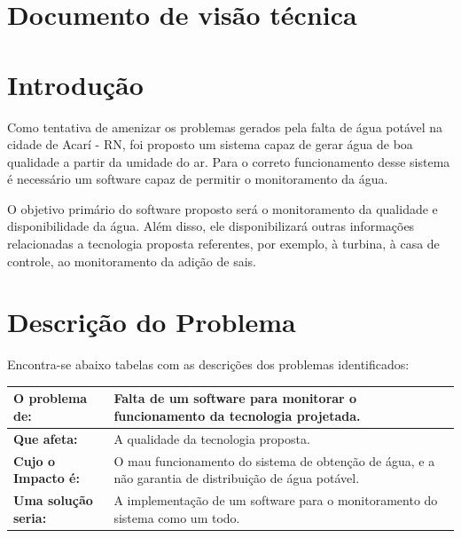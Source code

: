  
 
%
 
\section*{Documento de visão técnica}


\section*{Introdução}
Como tentativa de amenizar os problemas gerados pela falta de água potável na cidade de Acarí - RN, foi proposto um sistema capaz de gerar água de boa qualidade a partir da umidade do ar. Para o correto funcionamento desse sistema é necessário um software capaz de permitir o monitoramento da água.

O objetivo primário do software proposto será o monitoramento da qualidade e disponibilidade da água. Além disso, ele disponibilizará outras informações relacionadas a tecnologia proposta referentes, por exemplo, à turbina, à casa de controle, ao monitoramento da adição de sais.

\section*{Descrição do Problema}
Encontra-se abaixo tabelas com as descrições dos problemas identificados:
\begin{table}[!h]
\centering
\begin{tabular}{|p{4cm}|p{10cm}|}\hline
\textbf{O problema de:}&Falta de um software para monitorar o funcionamento da tecnologia projetada.\\ \hline
\textbf{Que afeta:}&A qualidade da tecnologia proposta.\\ \hline
\textbf{Cujo o Impacto é:}&	O mau funcionamento do sistema de obtenção de água, e a não garantia de distribuição de água potável.\\ \hline
\textbf{Uma solução seria:}&	A implementação de um software para o monitoramento do sistema como um todo.\\ \hline

\end{tabular}
\end{table}

